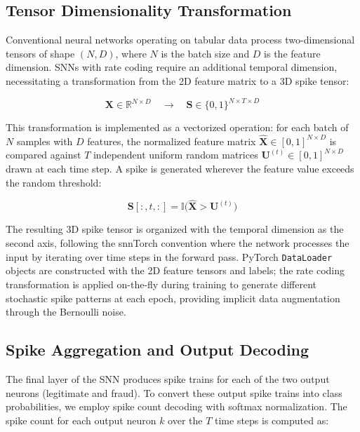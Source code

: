 \subsection{Tensor Dimensionality Transformation}

Conventional neural networks operating on tabular data process two-dimensional tensors of shape $(N, D)$, where $N$ is the batch size and $D$ is the feature dimension. SNNs with rate coding require an additional temporal dimension, necessitating a transformation from the 2D feature matrix to a 3D spike tensor:

\begin{equation}
\mathbf{X} \in \mathbb{R}^{N \times D} \quad \longrightarrow \quad \mathbf{S} \in \{0,1\}^{N \times T \times D}
\label{eq:snn-tensor-transform}
\end{equation}

This transformation is implemented as a vectorized operation: for each batch of $N$ samples with $D$ features, the normalized feature matrix $\hat{\mathbf{X}} \in [0,1]^{N \times D}$ is compared against $T$ independent uniform random matrices $\mathbf{U}^{(t)} \in [0,1]^{N \times D}$ drawn at each time step. A spike is generated wherever the feature value exceeds the random threshold:

\begin{equation}
\mathbf{S}[:, t, :] = \mathbb{I}\bigl(\hat{\mathbf{X}} > \mathbf{U}^{(t)}\bigr)
\label{eq:snn-vectorized-bernoulli}
\end{equation}

The resulting 3D spike tensor is organized with the temporal dimension as the second axis, following the snnTorch convention where the network processes the input by iterating over time steps in the forward pass. PyTorch \texttt{DataLoader} objects are constructed with the 2D feature tensors and labels; the rate coding transformation is applied on-the-fly during training to generate different stochastic spike patterns at each epoch, providing implicit data augmentation through the Bernoulli noise.

\subsection{Spike Aggregation and Output Decoding}

The final layer of the SNN produces spike trains for each of the two output neurons (legitimate and fraud). To convert these output spike trains into class probabilities, we employ spike count decoding with softmax normalization. The spike count for each output neuron $k$ over the $T$ time steps is computed as:

